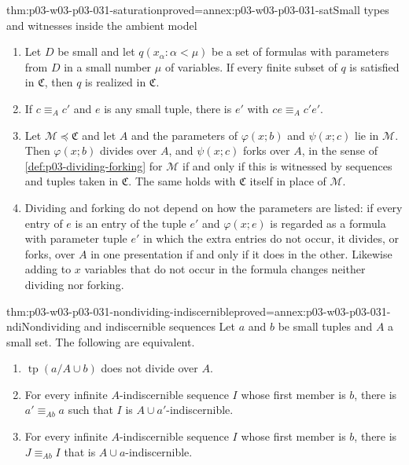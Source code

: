 \begin{hblemma}{thm:p03-w03-p03-031-saturation}{proved=annex:p03-w03-p03-031-sat}{Small types and witnesses inside the ambient model}
\begin{enumerate}
  \item Let \(D\) be small and let \(q(x_\alpha:\alpha<\mu)\) be a set of
        formulas with parameters from \(D\) in a small number \(\mu\) of
        variables.  If every finite subset of \(q\) is satisfied in
        \(\mathfrak C\), then \(q\) is realized in \(\mathfrak C\).
  \item If \(c\equiv_A c'\) and \(e\) is any small tuple, there is \(e'\)
        with \(ce\equiv_A c'e'\).
  \item Let \(\mathcal M\preccurlyeq\mathfrak C\) and let \(A\) and the
        parameters of \(\varphi(x;b)\) and \(\psi(x;c)\) lie in
        \(\mathcal M\).  Then \(\varphi(x;b)\) divides over \(A\), and
        \(\psi(x;c)\) forks over \(A\), in the sense of
        \cref{def:p03-dividing-forking} for \(\mathcal M\) if and only if
        this is witnessed by sequences and tuples taken in \(\mathfrak C\).
        The same holds with \(\mathfrak C\) itself in place of
        \(\mathcal M\).
  \item Dividing and forking do not depend on how the parameters are
        listed: if every entry of \(e\) is an entry of the tuple \(e'\)
        and \(\varphi(x;e)\) is regarded as a formula with parameter tuple
        \(e'\) in which the extra entries do not occur, it divides, or
        forks, over \(A\) in one presentation if and only if it does in
        the other.  Likewise adding to \(x\) variables that do not occur
        in the formula changes neither dividing nor forking.
\end{enumerate}
\end{hblemma}

\begin{hblemma}{thm:p03-w03-p03-031-nondividing-indiscernible}{proved=annex:p03-w03-p03-031-ndi}{Nondividing and indiscernible sequences}
Let \(a\) and \(b\) be small tuples and \(A\) a small set.  The following
are equivalent.
\begin{enumerate}
  \item \(\operatorname{tp}(a/A\cup b)\) does not divide over \(A\).
  \item For every infinite \(A\)-indiscernible sequence \(I\) whose first
        member is \(b\), there is \(a'\equiv_{Ab}a\) such that \(I\) is
        \(A\cup a'\)-indiscernible.
  \item For every infinite \(A\)-indiscernible sequence \(I\) whose first
        member is \(b\), there is \(J\equiv_{Ab}I\) that is
        \(A\cup a\)-indiscernible.
\end{enumerate}
\end{hblemma}

